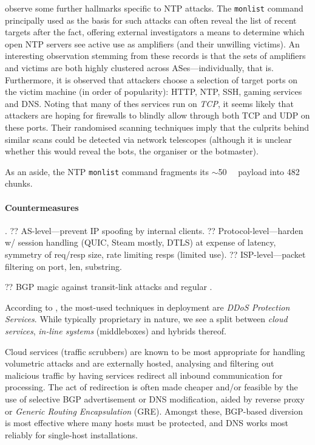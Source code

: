 \textcite{DBLP:conf/imc/CzyzKGPBK14} observe some further hallmarks specific to NTP attacks.
The \texttt{monlist} command principally used as the basis for such attacks can often reveal the list of recent targets after the fact, offering external investigators a means to determine which open NTP servers see active use as amplifiers (and their unwilling victims).
An interesting observation stemming from these records is that the sets of amplifiers and victims are both highly clustered across ASes---individually, that is.
Furthermore, it is observed that attackers choose a selection of target ports on the victim machine (in order of popularity): HTTP, NTP, SSH, gaming services and DNS.
Noting that many of thes services run on \emph{TCP}, it seems likely that attackers are hoping for firewalls to blindly allow through both TCP and UDP on these ports.
Their randomised scanning techniques imply that the culprits behind similar scans could be detected via network telescopes (although it is unclear whether this would reveal the bots, the organiser or the botmaster).

As an aside, the NTP \texttt{monlist} command fragments its $\sim$\SI{50}{\kibi\byte} payload into \SI{482}{\byte} chunks.

\paragraph{Countermeasures}
\textcite{DBLP:conf/ndss/Rossow14}.
?? AS-level---prevent IP spoofing by internal clients.
?? Protocol-level---harden w/ session handling (QUIC, Steam mostly, DTLS) at expense of latency, symmetry of req/resp size, rate limiting resps (limited use).
?? ISP-level---packet filtering on port, len, substring.

?? BGP magic against transit-link attacks and regular \cite{DBLP:conf/sp/SmithS18}.

According to \textcite{DBLP:conf/imc/JonkerKKRSD17}, the most-used techniques in deployment are \emph{DDoS Protection Services}.
While typically proprietary in nature, we see a split between \emph{cloud services}, \emph{in-line systems} (middleboxes) and hybrids thereof.

Cloud services (traffic scrubbers) are known to be most appropriate for handling volumetric attacks and are externally hosted, analysing and filtering out malicious traffic by having services redirect all inbound communication for processing.
The act of redirection is often made cheaper and/or feasible by the use of selective BGP advertisement or DNS modification, aided by reverse proxy or \emph{Generic Routing Encapsulation} (GRE).
Amongst these, BGP-based diversion is most effective where many hosts must be protected, and DNS works most reliably for single-host installations.

